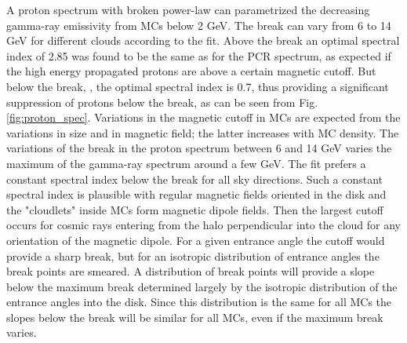 A proton spectrum with broken power-law can parametrized the decreasing gamma-ray emissivity from MCs below 2 GeV. The break can vary from 6 to 14 GeV for different clouds according to the fit. Above the break an optimal spectral index of 2.85 was found to be the same as for the PCR spectrum, as expected if the high energy propagated protons are above a certain magnetic cutoff. But below the break, , the optimal spectral index is 0.7, thus providing a significant suppression of protons below the break, as can be seen from Fig. \ref{fig:proton_spec}.  %
Variations in the magnetic cutoff in MCs are expected from the variations in size and in magnetic field; the latter increases with MC density. %
The variations of the break in the proton spectrum between 6 and 14 GeV varies the maximum of the gamma-ray spectrum around a few GeV.
The fit prefers a constant spectral index below the break for all sky directions. Such a constant spectral index is plausible with regular magnetic fields oriented in the disk %
and the "cloudlets" inside MCs %
form magnetic dipole fields. Then the largest cutoff occurs for cosmic rays entering from the halo perpendicular into the cloud for any orientation of the magnetic dipole. For a given entrance angle the cutoff would provide a sharp break, but for an isotropic distribution of entrance angles the break points are smeared. A distribution of break points will provide a slope below the maximum break determined largely by the isotropic distribution of the entrance angles into the disk. Since this distribution is the same for all MCs the slopes below the break will be similar for all MCs, even if the maximum break varies.

